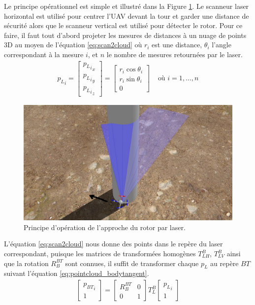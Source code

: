 Le principe opérationnel est simple et illustré dans la Figure \ref{fig:approach}. Le scanneur laser horizontal est utilisé pour centrer l'UAV devant la tour et garder une distance de sécurité alors que le scanneur vertical est utilisé pour détecter le rotor. Pour ce faire, il faut tout d'abord projeter les mesures de distances à un nuage de points 3D au moyen de l'équation \ref{eq:scan2cloud} où $r_i$ est une distance, $\theta_i$ l'angle correspondant à la mesure $i$, et $n$ le nombre de mesures retournées par le laser.
\begin{align}
  {p_{L}}_i = \begin{bmatrix}
    {{p_L}_i}_x \\
    {{p_L}_i}_y \\
    {{p_L}_i}_z
  \end{bmatrix} = \begin{bmatrix}r_i \cos \theta_i \\ r_i \sin \theta_i \\ 0 \end{bmatrix} & \text{ où } i=1,\ldots,n
    \label{eq:scan2cloud}
\end{align}
\begin{figure}[htp]
  \centering
  \includegraphics[width=0.8\linewidth]{images/principe_operation.jpg}
  \caption{Principe d'opération de l'approche du rotor par laser.}
  \label{fig:approach}
\end{figure}
L'équation \ref{eq:scan2cloud} nous donne des points dans le repère du laser correspondant, puisque les matrices de transformées homogènes $T_{LH}^B$, $T_{LV}^B$ ainsi que la rotation $R_B^{BT}$ sont connues, il suffit de transformer chaque $p_L$ au repère ${BT}$ suivant l'équation \ref{eq:pointcloud_bodytangent}.
\begin{align}
  \begin{bmatrix}{p_{BT}}_i \\ 1\end{bmatrix} = \begin{bmatrix}
    R_B^{BT} & 0 \\
    0 & 1
  \end{bmatrix} T_{L}^B\begin{bmatrix}{p_{L}}_i \\ 1\end{bmatrix}
  \label{eq:pointcloud_bodytangent}
\end{align}

